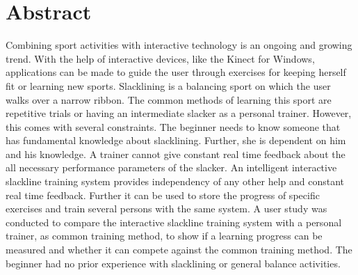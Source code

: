 \section*{Abstract}
\begin{comment}
- Einleitung
- Problem/Ziele
- Vorgesteller lösungsansatz
-- Exergame
-- SLS
-- Real time feedback
- einbau methodischer reihe als lernmethodik
- vergleich zu üblichen personal trainer
- Messung
- Results
- Conclusion


- trend von interaktiven lernmethodiken in allen bereichen des sports
- nichts vergeichbares in slacklinen
- Führen des nutzers mithilfe einer bestimmten lernmethodik und routine
- studie
\end{comment}
Combining sport activities with interactive technology is an ongoing and growing trend.
With the help of interactive devices, like the Kinect for Windows, applications can be made to guide the user through exercises for keeping herself fit or learning new sports.
Slacklining is a balancing sport on which the user walks over a narrow ribbon. The common methods of learning this sport are repetitive trials or having an intermediate slacker as a personal  trainer.
However, this comes with several constraints. The beginner needs to know someone that has fundamental knowledge about slacklining. Further, she is dependent on him and his knowledge. A trainer cannot give constant real time feedback about the all necessary performance parameters of the slacker.
An intelligent interactive slackline training system provides independency of any other help and constant real time feedback. Further it can be used to store the progress of specific exercises and train several persons with the same system.
A user study was conducted to compare the interactive slackline training system  with a personal trainer, as common training method, to show if a learning progress can be measured and whether it can compete against the common training method.
The beginner had no prior experience with slacklining or general balance activities.




